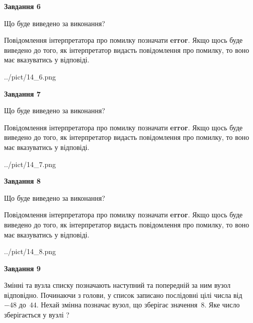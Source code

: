 \documentclass[12pt, ukrainian]{article}
\begin{document}
{\begin {large}
{\begin {center}\textbf{Завдання 6}\end {center}}\par
Що буде виведено за виконання?

Повідомлення інтерпретатора про помилку позначати \textbf{error}.
Якщо щось буде виведено до того, як інтерпретатор видасть повідомлення про помилку, 
то воно має вказуватись у відповіді. \par


\begin{center}
	{../pict/14_6.png}
\end{center}
\newpage

{\begin {center}\textbf{Завдання 7}\end {center}}\par
Що буде виведено за виконання?

Повідомлення інтерпретатора про помилку позначати \textbf{error}.
Якщо щось буде виведено до того, як інтерпретатор видасть повідомлення про помилку, 
то воно має вказуватись у відповіді. \par


\begin{center}
	{../pict/14_7.png}
\end{center}
\newpage

{\begin {center}\textbf{Завдання 8}\end {center}}\par
Що буде виведено за виконання?

Повідомлення інтерпретатора про помилку позначати \textbf{error}.
Якщо щось буде виведено до того, як інтерпретатор видасть повідомлення про помилку, 
то воно має вказуватись у відповіді. \par


\begin{center}
	{../pict/14_8.png}
\end{center}
\newpage

{\begin {center}\textbf{Завдання 9}\end {center}}\par
Змінні  та  вузла списку позначають наступний та попередній за ним вузол відповідно. Починаючи з голови, у список записано послідовні цілі числа від~$-48$ до~$44$. Нехай змінна  позначає вузол, що зберігає значення~$8$.
Яке число зберігається у вузлі  ?\par
\newpage


\end{large}}
\end{document}
